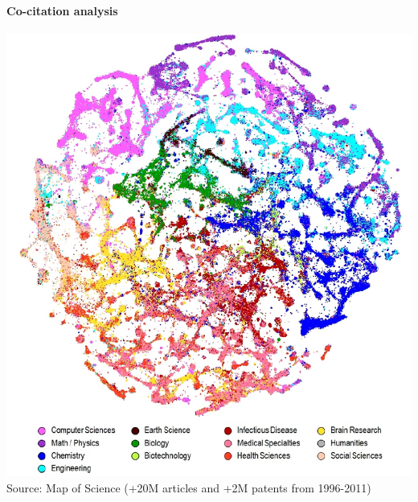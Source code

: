 \documentclass[8pt]{beamer}
\begin{document}

\begin{frame}
\frametitle{\insertsection}
\framesubtitle{Co-citation analysis}

\centering
\includegraphics[height=0.8\textheight]{mapscience}\\
\tiny{Source: Map of Science (+20M articles and +2M patents from 1996-2011) \cite{Boyack2014}}

\end{frame}

\end{document}
